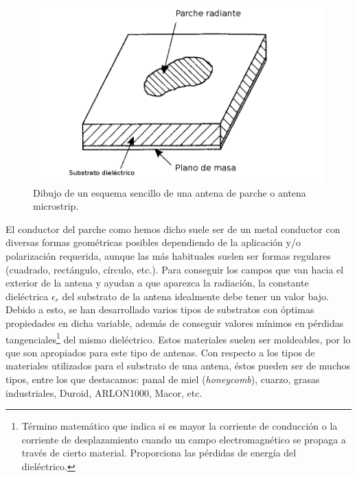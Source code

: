 \begin{figure}[!htb]
    \centering
    \includegraphics[scale=0.25]{./ContextoTecnologico/antena_parche}
    \caption{Dibujo de un esquema sencillo de una antena de parche o antena microstrip.}
    \label{fig:fig2.1}
\end{figure}

El conductor del parche como hemos dicho suele ser de un metal conductor con diversas formas geométricas posibles dependiendo de la aplicación y/o polarización requerida, aunque las más habituales suelen ser formas regulares (cuadrado, rectángulo, círculo, etc.). Para conseguir los campos que van hacia el exterior de la antena y ayudan a que aparezca la radiación, la constante dieléctrica  $\epsilon_{r}$ del substrato de la antena idealmente debe tener un valor bajo. Debido a esto, se han desarrollado varios tipos de substratos con óptimas propiedades en dicha variable, además de conseguir valores mínimos en pérdidas tangenciales\footnote{Término matemático que indica si es mayor la corriente de conducción o la corriente de desplazamiento cuando un campo electromagnético se propaga a través de cierto material. Proporciona las pérdidas de energía del dieléctrico.} del mismo dieléctrico. Estos materiales suelen ser moldeables, por lo que son apropiados para este tipo de antenas. Con respecto a los tipos de materiales utilizados para el substrato de una antena, éstos pueden ser de muchos tipos, entre los que destacamos: panal de miel (\textit{honeycomb}), cuarzo, grasas industriales, Duroid, ARLON1000, Macor, etc.

\clearpage

